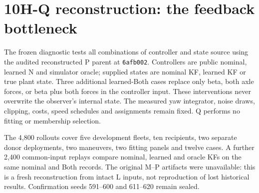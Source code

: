 \section{10H-Q reconstruction: the feedback bottleneck}
\label{sec:10hq}
The frozen diagnostic tests all combinations of controller and state source
using the audited reconstructed P parent at \texttt{6afb002}. Controllers are
public nominal, learned N and simulator oracle; supplied states are nominal
KF, learned KF or true plant state. Three additional learned-Both cases replace
only beta, both axle forces, or beta plus both forces in the controller input.
These interventions never overwrite the observer's internal state. The measured
yaw integrator, noise draws, clipping, costs, speed schedules and assignments
remain fixed. Q performs no fitting or membership selection.

The 4,800 rollouts cover five development fleets, ten recipients, two separate
donor deployments, two maneuvers, two fitting panels and twelve cases. A further
2,400 common-input replays compare nominal, learned and oracle KFs on the same
nominal and Both records. The original M--P artifacts were unavailable: this is
a fresh reconstruction from intact L inputs, not reproduction of lost historical
results. Confirmation seeds 591--600 and 611--620 remain sealed.

